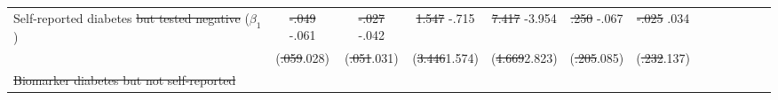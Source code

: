 \documentclass[12pt,english]{article}
\providecommand{\DIFaddtex}[1]{{\protect\color{blue}#1}} %
\providecommand{\DIFdeltex}[1]{{\protect\color{red}\sout{#1}}}                      %
\providecommand{\DIFaddFL}[1]{\DIFadd{#1}} %
\providecommand{\DIFdelFL}[1]{\DIFdel{#1}} %
\providecommand{\DIFaddbeginFL}{} %
\providecommand{\DIFaddendFL}{} %
\providecommand{\DIFdelbeginFL}{} %
\providecommand{\DIFdelendFL}{} %
\providecommand{\DIFadd}[1]{\texorpdfstring{\DIFaddtex{#1}}{#1}} %
\providecommand{\DIFdel}[1]{\texorpdfstring{\DIFdeltex{#1}}{}} %
\begin{document}
\begin{table}[!ht]
\begin{center}
\begin{adjustbox}{max width=\linewidth}
\begin{threeparttable}
{\begin{tabular}{l*{6}{S
								S}}
					Self-reported diabetes \DIFdelbeginFL \DIFdelFL{but tested negative }\DIFdelendFL ($\beta_{1}$)&    \DIFdelbeginFL \DIFdelFL{-.049         }\DIFdelendFL \DIFaddbeginFL \DIFaddFL{-.061}\sym{**} \DIFaddendFL &    \DIFdelbeginFL \DIFdelFL{-.027         }\DIFdelendFL \DIFaddbeginFL \DIFaddFL{-.042         }\DIFaddendFL &    \DIFdelbeginFL \DIFdelFL{1.547         }\DIFdelendFL \DIFaddbeginFL \DIFaddFL{-.715         }\DIFaddendFL &   \DIFdelbeginFL \DIFdelFL{7.417         }\DIFdelendFL \DIFaddbeginFL \DIFaddFL{-3.954         }\DIFaddendFL &    \DIFdelbeginFL \DIFdelFL{.250         }\DIFdelendFL \DIFaddbeginFL \DIFaddFL{-.067         }\DIFaddendFL &     \DIFdelbeginFL \DIFdelFL{-.025         }\DIFdelendFL \DIFaddbeginFL \DIFaddFL{.034         }\DIFaddendFL \\
					&   (\DIFdelbeginFL \DIFdelFL{.059}\DIFdelendFL \DIFaddbeginFL \DIFaddFL{.028}\DIFaddendFL )         &   (\DIFdelbeginFL \DIFdelFL{.051}\DIFdelendFL \DIFaddbeginFL \DIFaddFL{.031}\DIFaddendFL )         &  (\DIFdelbeginFL \DIFdelFL{3.446}\DIFdelendFL \DIFaddbeginFL \DIFaddFL{1.574}\DIFaddendFL )         &  (\DIFdelbeginFL \DIFdelFL{4.669}\DIFdelendFL \DIFaddbeginFL \DIFaddFL{2.823}\DIFaddendFL )         &   (\DIFdelbeginFL \DIFdelFL{.205}\DIFdelendFL \DIFaddbeginFL \DIFaddFL{.085}\DIFaddendFL )         &   (\DIFdelbeginFL \DIFdelFL{.232}\DIFdelendFL \DIFaddbeginFL \DIFaddFL{.137}\DIFaddendFL )         \\
				\DIFdelbeginFL \DIFdelFL{Biomarker diabetes but not self-reported }\DIFdelendFL \DIFaddbeginFL 


\end{tabular}}
\end{threeparttable}
\end{adjustbox}
\end{center}
\end{table}
\end{document}
